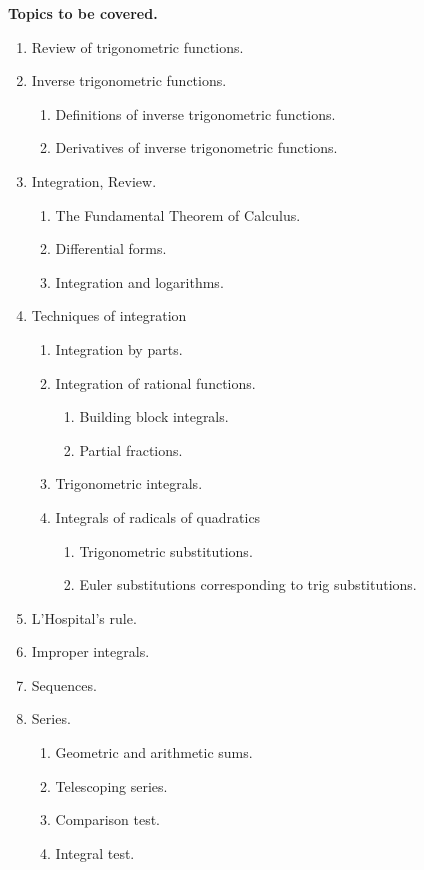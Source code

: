 \documentclass{article}
\begin{document}
\medskip
\noindent \textbf{Topics to be covered.} 
\renewcommand{\theenumii}{\arabic{enumii}}
\begin{enumerate}
\item Review of trigonometric functions.
\item Inverse trigonometric functions.
\begin{enumerate}
\item Definitions of inverse trigonometric functions.
\item Derivatives of inverse trigonometric functions.
\end{enumerate}
\item Integration, Review.
\begin{enumerate}
\item The Fundamental Theorem of Calculus.
\item Differential forms.
\item Integration and logarithms.
\end{enumerate}
\item Techniques of integration
\begin{enumerate}
\item Integration by parts.
\item Integration of rational functions.
\begin{enumerate}
\item Building block integrals.
\item Partial fractions.
\end{enumerate}
\item Trigonometric integrals.
\item Integrals of radicals of quadratics
\begin{enumerate}
\item Trigonometric substitutions.
\item Euler substitutions corresponding to trig substitutions.
\end{enumerate}
\end{enumerate}
\item L'Hospital's rule.
\item Improper integrals.
\item Sequences.
\item Series.
\begin{enumerate}
\item Geometric and arithmetic sums.
\item Telescoping series.
\item Comparison test.
\item Integral test.

\end{enumerate}
\end{enumerate}
\end{document}
